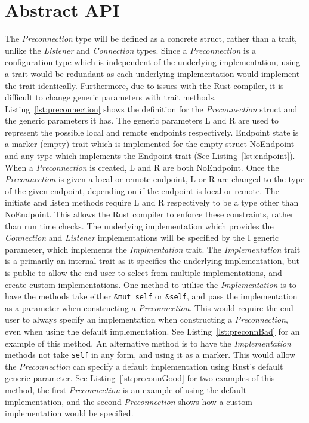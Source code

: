 \section{Abstract API}\label{sec:abstract-api}
The \emph{Preconnection} type will be defined as a concrete struct, rather than a trait, unlike the \emph{Listener} and
\emph{Connection} types.
Since a \emph{Preconnection} is a configuration type which is independent of the underlying implementation, using a
trait would be redundant as each underlying implementation would implement the trait identically.
Furthermore, due to issues with the Rust compiler, it is difficult to change generic parameters with trait methods.
Listing~\ref{lst:preconnection} shows the definition for the \emph{Preconnection} struct and the generic parameters it
has.
The generic parameters L and R are used to represent the possible local and remote endpoints respectively.
Endpoint state is a marker (empty) trait which is implemented for the empty struct NoEndpoint and any type which
implements the Endpoint trait (See Listing~\ref{lst:endpoint}).
When a \emph{Preconnection} is created, L and R are both NoEndpoint.
Once the \emph{Preconnection} is given a local or remote endpoint, L or R are changed to the type of the given endpoint,
depending on if the endpoint is local or remote.
The initiate and listen methods require L and R respectively to be a type other than NoEndpoint.
This allows the Rust compiler to enforce these constraints, rather than run time checks.
The underlying implementation which provides the \emph{Connection} and \emph{Listener} implementations will be specified
by the I generic parameter, which implements the \emph{Implmentation} trait.
The \emph{Implementation} trait is a primarily an internal trait as it specifies the underlying implementation, but is
public to allow the end user to select from multiple implementations, and create custom implementations.
One method to utilise the \emph{Implementation} is to have the methods take either \texttt{\&mut self} or
\texttt{\&self}, and pass the implementation as a parameter when constructing a \emph{Preconnection}.
This would require the end user to always specify an implementation when constructing a \emph{Preconnection}, even when
using the default implementation.
See Listing~\ref{lst:preconnBad} for an example of this method.
An alternative method is to have the \emph{Implementation} methods not take \texttt{self} in any form, and using it as a
marker.
This would allow the \emph{Preconnection} can specify a default implementation using Rust's default generic parameter.
See Listing~\ref{lst:preconnGood} for two examples of this method, the first \emph{Preconnection} is an example of using
the default implementation, and the second \emph{Preconnection} shows how a custom implementation would be specified.

